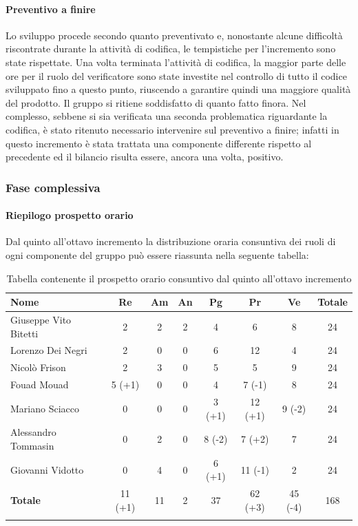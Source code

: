 		\paragraph{Preventivo a finire}
			Lo sviluppo procede secondo quanto preventivato e, nonostante alcune difficoltà riscontrate durante la attività di codifica, le tempistiche per l'incremento sono state rispettate.
			\newline
			Una volta terminata l'attività di codifica, la maggior parte delle ore per il ruolo del verificatore sono state investite nel controllo di tutto il codice sviluppato fino a questo punto, riuscendo a garantire quindi una maggiore qualità del prodotto. Il gruppo si ritiene soddisfatto di quanto fatto finora.
			\newline
			Nel complesso, sebbene si sia verificata una seconda problematica riguardante la codifica, è stato ritenuto necessario intervenire sul preventivo a finire; infatti in questo incremento è stata trattata una componente differente rispetto al precedente ed il bilancio risulta essere, ancora una volta, positivo.
			
		\subsubsection{Fase complessiva}
		
		\paragraph{Riepilogo prospetto orario}
		Dal quinto all'ottavo incremento la distribuzione oraria consuntiva dei ruoli di ogni componente del gruppo può essere riassunta nella seguente tabella:
		
		\begin{longtable}{|l|c|c|c|c|c|c|c|}
			\hline
			\rowcolor{lighter-grayer}
			\textbf{Nome} & \textbf{Re} & \textbf{Am} & \textbf{An} & \textbf{Pg}  & \textbf{Pr}   & \textbf{Ve} & \textbf{Totale} \\
			\hline
			\endfirsthead
			
			\hline
			Giuseppe Vito Bitetti 		 & 2 & 2 & 2 & 4 & 6 & 8 & 24\\
			\hline
			\hline
			Lorenzo Dei Negri			 & 2 & 0 & 0 & 6 & 12 & 4 & 24\\
			\hline
			\hline
			Nicolò Frison				    & 2 & 3 & 0 & 5 & 5 & 9 & 24\\
			\hline
			\hline
			Fouad Mouad 				 & 5 (+1) & 0 & 0 & 4 & 7 (-1) & 8 & 24\\
			\hline
			\hline
			Mariano Sciacco 			 & 0 & 0 & 0 & 3 (+1) & 12 (+1) & 9 (-2) & 24\\
			\hline
			\hline
			Alessandro Tommasin     & 0 & 2 & 0 & 8 (-2) & 7 (+2) & 7 & 24\\
			\hline
			\hline
			Giovanni Vidotto 			 & 0 & 4 & 0 & 6 (+1) & 11 (-1) & 2 & 24\\
			\hline 
			\textbf{Totale}			 		& 11 (+1) & 11 & 2 & 37 & 62 (+3) & 45 (-4) & 168\\
			\hline
			\caption{Tabella contenente il prospetto orario consuntivo dal quinto all'ottavo incremento}
		\end{longtable}
		
